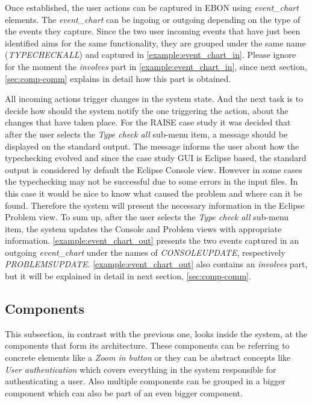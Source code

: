 \documentclass[conference]{IEEEtran}
\begin{document}
Once established, the user actions can be captured in EBON using
\emph{event\_chart} elements. The \emph{event\_chart} can be ingoing
or outgoing depending on the type of the events they capture. Since
the two user incoming events that have just been identified aims for
the same functionality, they are grouped under the same name
(\emph{TYPECHECKALL}) and captured in
\autoref{example:event_chart_in}. Please ignore for the moment the
\emph{involves} part in \autoref{example:event_chart_in}, since next
section, \autoref{sec:comp-comm} explains in detail how this part is
obtained.




All incoming actions trigger changes in the system state. And the
next task is to decide how should the system notify the one triggering the
action, about the changes that have taken place. For the RAISE case
study it was decided that after the user selects the \emph{Type check
all} sub-menu item, a message should be displayed on the standard output.
The message informs the user about how the typechecking evolved and
since the case study GUI is Eclipse based, the standard output is considered by
default the Eclipse Console view. However in some cases the
typechecking may not be successful due to some errors in the input
files. In this case it would be nice to know what caused the problem
and where can it be found. Therefore the system will present the
necessary information in the Eclipse Problem view. To sum up, after the
user selects the \emph{Type check all} sub-menu item, the system updates the
Console and Problem views with appropriate information.
\autoref{example:event_chart_out} presents the two events captured in
an outgoing \emph{event\_chart} under the names of
\emph{CONSOLEUPDATE}, respectively \emph{PROBLEMSUPDATE}.
\autoref{example:event_chart_out} also contains an \emph{involves}
part, but it will be explained in detail in next section,
\autoref{sec:comp-comm}.


%
\subsection{Components}
\label{sec:components}

This subsection, in contrast with the previous one, looks inside the
system, at the components that form its architecture. These components
can be referring to concrete elements like a \emph{Zoom in button} or
they can be abstract concepts like \emph{User authentication} which
covers everything in the system responsible for authenticating a user.
Also multiple components can be grouped in a bigger component which
can also be part of an even bigger component.
\end{document}
